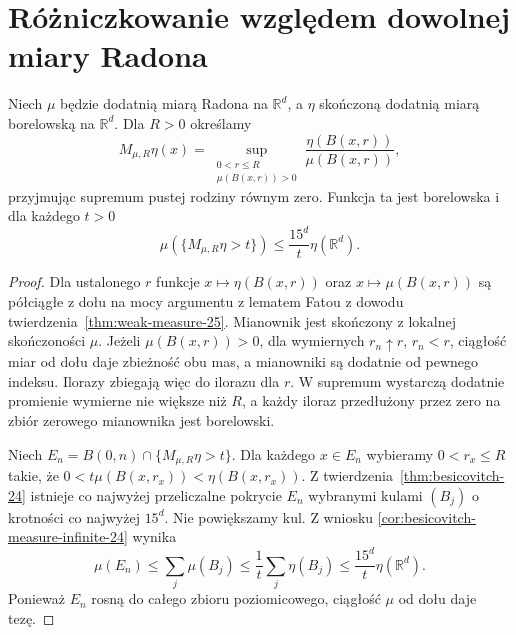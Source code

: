 \section{Różniczkowanie względem dowolnej miary Radona}

\begin{lemat}
\label{lem:relative-maximal-25}
Niech $\mu$ będzie dodatnią miarą Radona na $\mathbb R^d$,
a $\eta$ skończoną dodatnią miarą borelowską na $\mathbb R^d$.
Dla $R>0$ określamy
\[
 M_{\mu,R}\eta(x)=
 \sup_{\substack{0<r\le R\\\mu(B(x,r))>0}}
 \frac{\eta(B(x,r))}{\mu(B(x,r))},
\]
przyjmując supremum pustej rodziny równym zero.
Funkcja ta jest borelowska i dla każdego $t>0$
\[
 \mu(\{M_{\mu,R}\eta>t\})\le\frac{15^d}{t}\eta(\mathbb R^d).
\]
\end{lemat}
\begin{proof}
Dla ustalonego $r$ funkcje $x\mapsto\eta(B(x,r))$
oraz $x\mapsto\mu(B(x,r))$ są półciągłe z dołu
na mocy argumentu z lematem Fatou z dowodu
twierdzenia~\ref{thm:weak-measure-25}. Mianownik jest
skończony z lokalnej skończoności $\mu$.
Jeżeli $\mu(B(x,r))>0$, dla wymiernych $r_n\uparrow r$,
$r_n<r$, ciągłość miar od dołu daje zbieżność obu mas,
a mianowniki są dodatnie od pewnego indeksu. Ilorazy
zbiegają więc do ilorazu dla $r$. W supremum wystarczą
dodatnie promienie wymierne nie większe niż $R$, a każdy
iloraz przedłużony przez zero na zbiór zerowego
mianownika jest borelowski.

Niech $E_n=B(0,n)\cap\{M_{\mu,R}\eta>t\}$.
Dla każdego $x\in E_n$ wybieramy $0<r_x\le R$ takie, że
$0<t\mu(B(x,r_x))<\eta(B(x,r_x))$.
Z twierdzenia~\ref{thm:besicovitch-24} istnieje
co najwyżej przeliczalne pokrycie $E_n$ wybranymi
kulami $(B_j)$ o krotności co najwyżej $15^d$.
Nie powiększamy kul. Z wniosku
\ref{cor:besicovitch-measure-infinite-24} wynika
\[
 \mu(E_n)\le\sum_j\mu(B_j)
 \le\frac1t\sum_j\eta(B_j)
 \le\frac{15^d}{t}\eta(\mathbb R^d).
\]
Ponieważ $E_n$ rosną do całego zbioru poziomicowego,
ciągłość $\mu$ od dołu daje tezę.
\end{proof}

